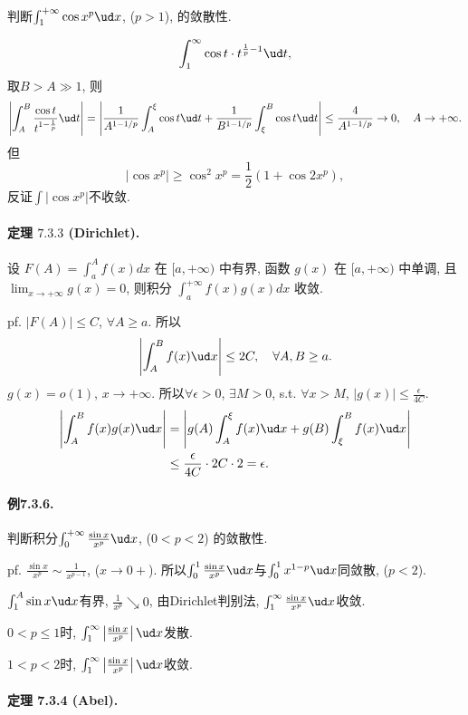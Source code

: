 判断$\int_{1}^{+\infty}\cos x^{p}\ud x$, ($p>1$), 的敛散性.

\[
\int_{1}^{\infty}\cos t\cdot t^{\frac{1}{p}-1}\ud t,
\]
取$B>A\gg1$, 则
\[
\left|\int_{A}^{B}\frac{\cos t}{t^{1-\frac{1}{p}}}\ud t\right|=\left|\frac{1}{A^{1-1/p}}\int_{A}^{\xi}\cos t\ud t+\frac{1}{B^{1-1/p}}\int_{\xi}^{B}\cos t\ud t\right|\le\frac{4}{A^{1-1/p}}\to0,\quad A\to+\infty.
\]
但
\[
\left|\cos x^{p}\right|\ge\cos^{2}x^{p}=\frac{1}{2}\left(1+\cos2x^{p}\right),
\]
反证$\int\left|\cos x^{p}\right|$不收敛.

\paragraph{定理 $7.3.3$ (Dirichlet). }

设 $F(A)=\int_{a}^{A}f(x)dx$ 在 $[a,+\infty)$ 中有界, 函数 $g(x)$ 在 $[a,+\infty)$
中单调, 且 $\lim_{x\rightarrow+\infty}g(x)=0$, 则积分 $\int_{a}^{+\infty}f(x)g(x)dx$
收敛.

pf. $\left|F(A)\right|\le C$, $\forall A\ge a$. 所以
\[
\left|\int_{A}^{B}f(x)\ud x\right|\le2C,\quad\forall A,B\ge a.
\]
$g(x)=o(1)$, $x\to+\infty$. 所以$\forall\epsilon>0$, $\exists M>0$,
s.t. $\forall x>M$, $\left|g(x)\right|\le\frac{\epsilon}{4C}$.
\begin{align*}
	\left|\int_{A}^{B}f(x)g(x)\ud x\right| & =\left|g(A)\int_{A}^{\xi}f(x)\ud x+g(B)\int_{\xi}^{B}f(x)\ud x\right|\\
	& \le\frac{\epsilon}{4C}\cdot2C\cdot2=\epsilon.
\end{align*}


\paragraph{例7.3.6.}

判断积分$\int_{0}^{+\infty}\frac{\sin x}{x^{p}}\ud x$, ($0<p<2$) 的敛散性.

pf. $\frac{\sin x}{x^{p}}\sim\frac{1}{x^{p-1}}$, ($x\to0+$). 所以$\int_{0}^{1}\frac{\sin x}{x^{p}}\ud x$与$\int_{0}^{1}x^{1-p}\ud x$同敛散,
($p<2$).

$\int_{1}^{A}\sin x\ud x$有界, $\frac{1}{x^{p}}\searrow0$, 由Dirichlet判别法,
$\int_{1}^{\infty}\frac{\sin x}{x^{p}}\ud x$收敛.

$0<p\le1$时, $\int_{1}^{\infty}\left|\frac{\sin x}{x^{p}}\right|\ud x$发散.

$1<p<2$时, $\int_{1}^{\infty}\left|\frac{\sin x}{x^{p}}\right|\ud x$收敛.

\paragraph{定理 7.3.4 (Abel). }

